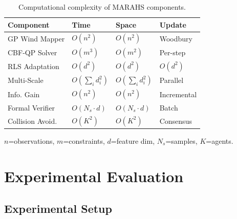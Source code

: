 \documentclass[12pt,a4paper,twocolumn]{article}
\begin{document}
\begin{table}[t]
\centering
\caption{Computational complexity of MARAHS components.}
\label{tab:complexity}
\small
\begin{tabular}{llll}
\toprule
\textbf{Component} & \textbf{Time} & \textbf{Space} & \textbf{Update} \\
\midrule
GP Wind Mapper & $O(n^2)$ & $O(n^2)$ & Woodbury \\
CBF-QP Solver & $O(m^3)$ & $O(m^2)$ & Per-step \\
RLS Adaptation & $O(d^2)$ & $O(d^2)$ & $O(d^2)$ \\
Multi-Scale & $O(\sum_i d_i^2)$ & $O(\sum_i d_i^2)$ & Parallel \\
Info. Gain & $O(n^2)$ & $O(n^2)$ & Incremental \\
Formal Verifier & $O(N_s \cdot d)$ & $O(N_s \cdot d)$ & Batch \\
Collision Avoid. & $O(K^2)$ & $O(K^2)$ & Consensus \\
\bottomrule
\end{tabular}
\vspace{2pt}
\footnotesize $n$=observations, $m$=constraints, $d$=feature dim, $N_s$=samples, $K$=agents.
\end{table}


\section{Experimental Evaluation}
\label{sec:experiments}

\subsection{Experimental Setup}
\label{sec:setup}
\end{document}

